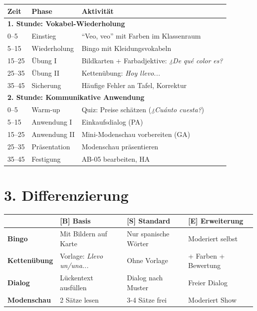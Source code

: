 \documentclass[11pt, a4paper]{article}
\begin{document}
\begin{longtable}{|p{1.2cm}|p{3cm}|p{9cm}|}
\hline
\textbf{Zeit} & \textbf{Phase} & \textbf{Aktivität} \\
\hline
\endhead

\multicolumn{3}{|l|}{\textbf{1. Stunde: Vokabel-Wiederholung}} \\
\hline
0--5 & Einstieg & ``Veo, veo'' mit Farben im Klassenraum \\
\hline
5--15 & Wiederholung & Bingo mit Kleidungsvokabeln \\
\hline
15--25 & Übung I & Bildkarten + Farbadjektive: \textit{¿De qué color es?} \\
\hline
25--35 & Übung II & Kettenübung: \textit{Hoy llevo...} \\
\hline
35--45 & Sicherung & Häufige Fehler an Tafel, Korrektur \\
\hline

\multicolumn{3}{|l|}{\textbf{2. Stunde: Kommunikative Anwendung}} \\
\hline
0--5 & Warm-up & Quiz: Preise schätzen (\textit{¿Cuánto cuesta?}) \\
\hline
5--15 & Anwendung I & Einkaufsdialog (PA) \\
\hline
15--25 & Anwendung II & Mini-Modenschau vorbereiten (GA) \\
\hline
25--35 & Präsentation & Modenschau präsentieren \\
\hline
35--45 & Festigung & AB-05 bearbeiten, HA \\
\hline
\end{longtable}


\section*{3. Differenzierung}

\begin{tabular}{|l|p{4cm}|p{4cm}|p{4cm}|}
\hline
& \textbf{[B] Basis} & \textbf{[S] Standard} & \textbf{[E] Erweiterung} \\
\hline
\textbf{Bingo} & Mit Bildern auf Karte & Nur spanische Wörter & Moderiert selbst \\
\hline
\textbf{Kettenübung} & Vorlage: \textit{Llevo un/una...} & Ohne Vorlage & + Farben + Bewertung \\
\hline
\textbf{Dialog} & Lückentext ausfüllen & Dialog nach Muster & Freier Dialog \\
\hline
\textbf{Modenschau} & 2 Sätze lesen & 3-4 Sätze frei & Moderiert Show \\
\hline
\end{tabular}
\end{document}
